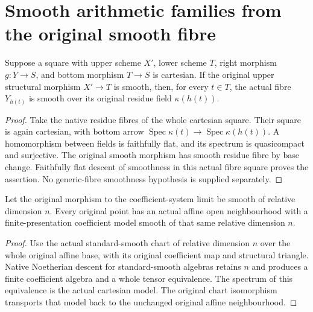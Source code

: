 \section{Smooth arithmetic families from the original smooth fibre}

\begin{lemma}
\label{lem:kn-arithmetic-original-smooth-fibre}
\leanok
Suppose a square with upper scheme $X'$, lower scheme $T$, right
morphism $g:Y\to S$, and bottom morphism $T\to S$ is cartesian.
If the original upper structural morphism $X'\to T$ is smooth, then,
for every $t\in T$, the actual fibre $Y_{h(t)}$ is smooth over its
original residue field $\kappa(h(t))$.
\end{lemma}
\begin{proof}
Take the native residue fibres of the whole cartesian square.  Their
square is again cartesian, with bottom arrow
$\operatorname{Spec}\kappa(t)\to\operatorname{Spec}\kappa(h(t))$.
A homomorphism between fields is faithfully flat, and its spectrum is
quasicompact and surjective.  The original smooth morphism has smooth
residue fibre by base change.  Faithfully flat descent of smoothness
in this actual fibre square proves the assertion.  No generic-fibre
smoothness hypothesis is supplied separately.
\end{proof}

\begin{lemma}
\label{lem:kn-arithmetic-original-dimension-chart-model}
\leanok
Let the original morphism to the coefficient-system limit be smooth of
relative dimension $n$. Every original point has an actual affine open
neighbourhood with a finite-presentation coefficient model smooth of
that same relative dimension $n$.
\end{lemma}
\begin{proof}
Use the actual standard-smooth chart of relative dimension $n$ over the
whole original affine base, with its original coefficient map and
structural triangle. Native Noetherian descent for standard-smooth
algebras retains $n$ and produces a finite coefficient algebra and a
whole tensor equivalence. The spectrum of this equivalence is the
actual cartesian model. The original chart isomorphism transports
that model back to the unchanged original affine neighbourhood.
\end{proof}

